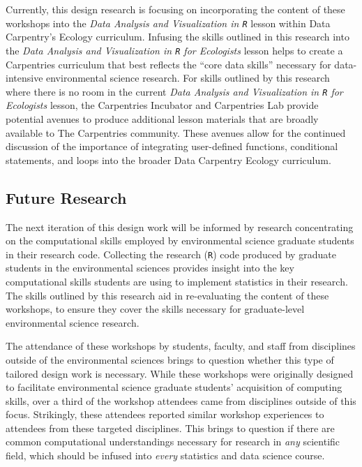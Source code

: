 \documentclass[12pt]{article}
\begin{document}

\quad Currently, this design research is focusing on incorporating the content of these workshops into the \emph{Data Analysis and Visualization in \texttt{R}} lesson within Data Carpentry's Ecology curriculum. Infusing the skills outlined in this research into the \emph{Data Analysis and Visualization in \texttt{R} for Ecologists} lesson helps to create a Carpentries curriculum that best reflects the ``core data skills'' necessary for data-intensive environmental science research. For skills outlined by this research where there is no room in the current \emph{Data Analysis and Visualization in \texttt{R} for Ecologists} lesson, the Carpentries Incubator and Carpentries Lab provide potential avenues to produce additional lesson materials that are broadly available to The Carpentries community. These avenues allow for the continued discussion of the importance of integrating user-defined functions, conditional statements, and loops into the broader Data Carpentry Ecology curriculum.    

\subsection{Future Research} 

\quad The next iteration of this design work will be informed by research concentrating on the computational skills employed by environmental science graduate students in their research code. Collecting the research (\texttt{R}) code produced by graduate students in the environmental sciences provides insight into the key computational skills students are using to implement statistics in their research. The skills outlined by this research aid in re-evaluating the content of these workshops, to ensure they cover the skills necessary for graduate-level environmental science research. 

\quad The attendance of these workshops by students, faculty, and staff from disciplines outside of the environmental sciences brings to question whether this type of tailored design work is necessary. While these workshops were originally designed to facilitate environmental science graduate students' acquisition of computing skills, over a third of the workshop attendees came from disciplines outside of this focus. Strikingly, these attendees reported similar workshop experiences to attendees from these targeted disciplines. This brings to question if there are common computational understandings necessary for research in \emph{any} scientific field, which should be infused into \emph{every} statistics and data science course. 
\end{document}
